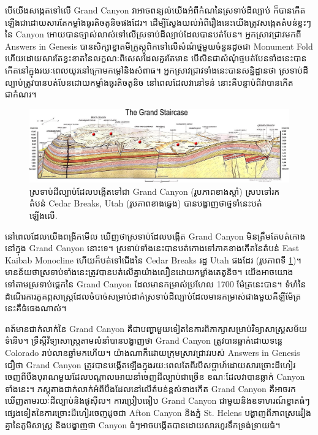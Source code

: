 \documentclass[10pt,twocolumn,letterpaper]{article}
\begin{document}
បើយើងសង្កេតទៅលើ Grand Canyon វាអាចពន្យល់យើងអំពីកំណនៃស្រទាប់ដីល្បាប់ ក៏បានកើតឡើងជាដោយសារតែកម្លាំងធូរតិចតូនិចផងដែរ។ ដើម្បីស្វែងយល់អំពីរឿងនេះយើងត្រូវសង្កេតតំបន់ខ្លះៗនៃ Canyon អោយបានច្បាស់លាស់ទៅលើស្រទាប់ដីល្បាប់ដែលបានបត់បែន។ អ្នកស្រាវជ្រាវមកពី Answers in Genesis\cite{42} បានសិក្សាខ្នាតមីក្រូស្កូពិកទៅលើសំណំថ្មមួយចំនួនដូចជា Monument Fold ហើយដោយសារតែខ្វះខាតនៃលក្ខណៈពិសេសដែលគួរតែមាន បើសិនជាសំណុំថ្មបត់បែនទាំងនេះបានកើតនៅក្នុងរយៈពេលយូរនៅក្រោមកម្តៅនិងសំពាធ។ អ្នកស្រាវជ្រាវទាំងនេះបានសន្និដ្ឋានថា ស្រទាប់ដីល្បាប់ត្រូវបានបត់បែនដោយកម្លាំងធូរតិចតូនិច នៅពេលដែលវានៅទន់ នោះគឺបន្ទាប់ពីវាបានកើតជាកំណរ\cite{43}។

\begin{figure}
\begin{center}
\includegraphics[width=1\textwidth]{Grand_Staircase-big.jpg}
\end{center}
   \caption{ស្រទាប់ដីល្បាប់ដែលបង្កើតទៅជា Grand Canyon (រូបភាពខាងស្តាំ) ស្របទៅរកតំបន់ Cedar Breaks, Utah (រូបភាពខាងឆ្វេង) បានបង្ហាញថាថ្មទាំនេះបត់ឡើងលើ\cite{50}.}
\label{fig:4}
\end{figure}

នៅពេលដែលយើងពង្រីកមើល ឃើញថាស្រទាប់ដែលបង្កើត Grand Canyon មិនត្រឹមតែបត់កោងនៅក្នុង Grand Canyon នោះទេ។ ស្រទាប់ទាំងនេះបានបត់កោងទៅភាគខាងកើតនៃតំបន់ East Kaibab Monocline\cite{46} ហើយក៏បត់ទៅជើងនៃ Cedar Breaks រដ្ឋ Utah ផងដែរ (រូបភាពទី \ref{fig:4})។ មានន័យថាស្រទាប់ទាំងនេះត្រូវបានបត់លើគ្នាយ៉ាងលឿនដោយកម្លាំងតេតូនិច។ យើងអាចយោងទៅតាមស្រទាប់ផ្តេកនៃ Grand Canyon ដែលមានកម្រាស់ប្រហែល 1700 ម៉ែត្រនេះបាន។ ទំហំនៃដំណើរការភូគព្ភសាស្ត្រដែលចំបាច់សម្រាប់ដាក់ស្រទាប់ដីល្បាប់ដែលមានកម្រាស់ជាងមួយគីឡីម៉ែត្រនេះគឺធំធេងណាស់។ 

ពត៍មានជាក់លាក់នៃ Grand Canyon គឺជាបញ្ហាមួយទៀតនៃការពិភាក្សាសម្រាប់វិទ្យាសាស្ត្រសម័យទំនើប។ ទ្រឹស្តីវិទ្យាសាស្ត្រតាមលំនាំបានបង្ហាញថា Grand Canyon ត្រូវបានឆ្លាក់ដោយទន្លេ Colorado រាប់លានឆ្នាំមកហើយ\cite{47}។ យ៉ាងណាក៏ដោយក្រុមស្រាវជ្រាវរបស់ Answers in Genesis ជឿថា Grand Canyon ត្រូវបានបង្កើតឡើងក្នុងរយៈពេលតែពីរបីសប្តាហ៍ដោយសារច្រោះដីហៀរចេញពីបឹងបុរាណមួយដែលបណ្តាលអោយនាំចេញដីល្បាប់ជាច្រើន ខណៈដែលវាបានឆ្លាក់ Canyon ទាំងនេះ។ ភស្តុតាងជាក់លាក់អំពីបឹងដែលនៅលើតំបន់ខ្ពស់ខាងកើត Grand Canyon គឺអាចរកឃើញតាមរយៈដីល្បាប់និងផូសុីល។ ការប្រៀបធៀប Grand Canyon ជាមួយនិងឧទាហរណ៍ខ្នាតធំៗផ្សេងទៀតនៃការច្រោះដីហៀរចេញដូចជា Afton Canyon និងភ្នំ St. Helens បង្ហាញពីភាពស្រដៀងគ្នានៃភូមិសាស្ត្រ និងបង្ហាញថា Canyon ធំៗអាចបង្កើតបានដោយសារហូរទឹកទ្រង់ទ្រាយធំ\cite{48}។
\end{document}
